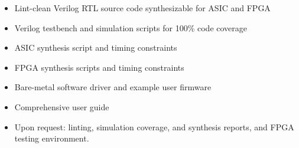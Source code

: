 \begin{itemize}
  \itemsep-0.5em
\item Lint-clean Verilog RTL source code synthesizable for ASIC and FPGA
\item Verilog testbench and simulation scripts for 100\% code coverage
\item ASIC synthesis script and timing constraints
\item FPGA synthesis scripts  and timing constraints
\item Bare-metal software driver and example user firmware
\item Comprehensive user guide
\item Upon request: linting, simulation coverage, and synthesis reports, and FPGA testing environment.
\end{itemize}
